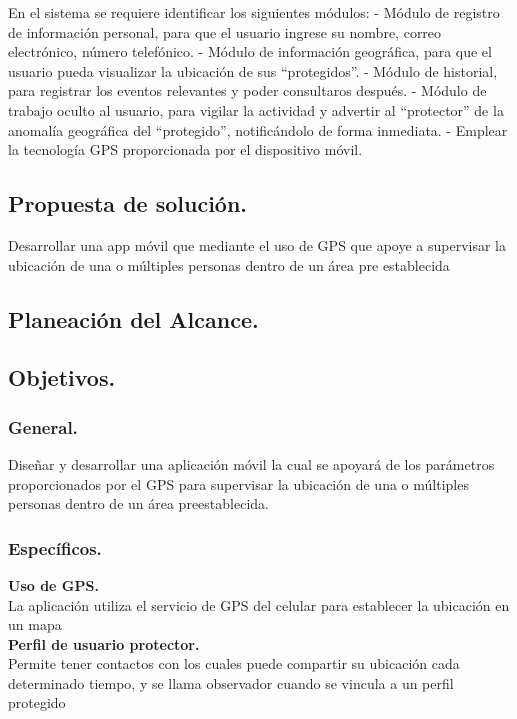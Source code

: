 \documentclass[10pt]{article}
\begin{document}
En el sistema se requiere identificar los siguientes módulos:
-      Módulo de registro de información personal, para que el usuario ingrese su nombre, correo electrónico, número telefónico.
-      Módulo de información geográfica, para que el usuario pueda visualizar la ubicación de sus “protegidos”.
-      Módulo de historial, para registrar los eventos relevantes y poder consultaros después.  
-      Módulo de trabajo oculto al usuario, para vigilar la actividad y advertir  al “protector” de la anomalía geográfica del “protegido”, notificándolo de forma inmediata.
-      Emplear la tecnología GPS proporcionada por el dispositivo móvil.


\subsection{Propuesta de solución.}
Desarrollar una app móvil que mediante el uso de GPS que apoye a supervisar la ubicación de una o múltiples personas dentro de un área pre establecida  
\newpage 
\subsection{Planeación del Alcance.}
\subsection{Objetivos.}
\subsubsection{General.}
Diseñar y desarrollar una aplicación móvil la cual se apoyará de los parámetros proporcionados por el GPS para supervisar la ubicación de una o múltiples personas dentro de un  área preestablecida.
\subsubsection{Específicos.}

\textbf{ Uso de GPS.} \\ 

La aplicación utiliza el servicio de GPS del celular para establecer la ubicación en un mapa  \\

\textbf{ Perfil de usuario protector.}  \\

Permite tener contactos con los cuales puede compartir su ubicación cada determinado tiempo, y se llama observador cuando se vincula a un perfil protegido \\
\end{document}
